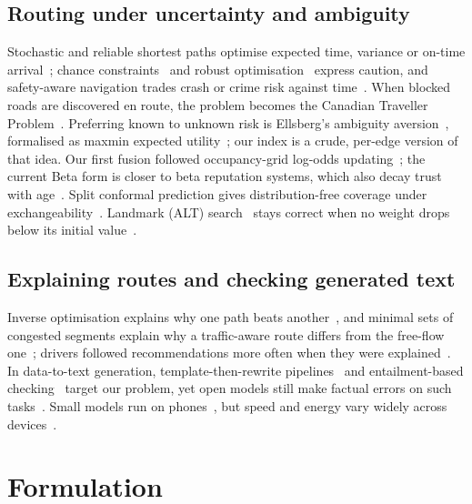 \documentclass[conference]{IEEEtran}
\begin{document}
\subsection{Routing under uncertainty and ambiguity}
Stochastic and reliable shortest paths optimise expected time, variance or on-time arrival~\cite{frank1969probabilistic,fu1998expected,nie2009ontime,samaranayake2012reliable}; chance constraints~\cite{charnes1959chance} and robust optimisation~\cite{bertsimas2003robust} express caution, and safety-aware navigation trades crash or crime risk against time~\cite{galbrun2016safe,krumm2017riskaware}. When blocked roads are discovered en route, the problem becomes the Canadian Traveller Problem~\cite{papadimitriou1991ctp}. Preferring known to unknown risk is Ellsberg's ambiguity aversion~\cite{ellsberg1961risk}, formalised as maxmin expected utility~\cite{gilboa1989maxmin}; our index is a crude, per-edge version of that idea. Our first fusion followed occupancy-grid log-odds updating~\cite{elfes1989occupancy}; the current Beta form is closer to beta reputation systems, which also decay trust with age~\cite{josang2002beta}. Split conformal prediction gives distribution-free coverage under exchangeability~\cite{angelopoulos2023conformal}. Landmark (ALT) search~\cite{goldberg2005alt} stays correct when no weight drops below its initial value~\cite{delling2007landmark}.

\subsection{Explaining routes and checking generated text}
Inverse optimisation explains why one path beats another~\cite{alsheeb2023explainable}, and minimal sets of congested segments explain why a traffic-aware route differs from the free-flow one~\cite{schild2025route}; drivers followed recommendations more often when they were explained~\cite{thill2018adherence}. In data-to-text generation, template-then-rewrite pipelines~\cite{kale2020t2g2} and entailment-based checking~\cite{dusek2020nli} target our problem, yet open models still make factual errors on such tasks~\cite{kasner2024quintd}. Small models run on phones~\cite{gemma2025gemma3}, but speed and energy vary widely across devices~\cite{laskaridis2024melt}.

\section{Formulation}\label{sec:model}
\end{document}
